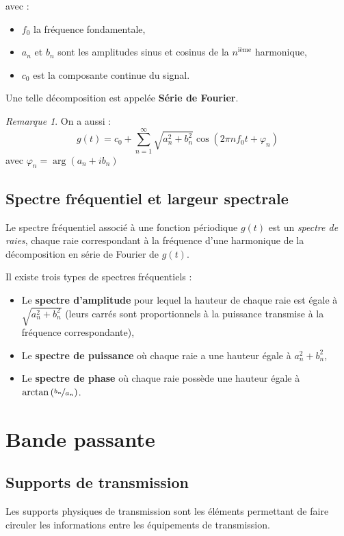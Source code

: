 \documentclass[11pt,english,french]{scrreprt}
\theoremstyle{remark}
\newtheorem*{rem*}{Remarque}
\theoremstyle{definition}
\begin{document}
avec :\begin{itemize}
	\item $f_0$ la fréquence fondamentale,
	\item $a_n$ et $b_n$ sont les amplitudes sinus et cosinus de la $n^{\textrm{ième}}$ harmonique,
	\item $c_0$ est la composante continue du signal.
\end{itemize}
Une telle décomposition est appelée \textbf{Série de Fourier}. 

\begin{rem*}
	On a aussi :
	\[
		g(t)=c_0+\sum_{n=1}^{\infty}\sqrt{a_n^2+b_n^2}\cos(2\pi n f_0 t+\varphi_n)
	\]avec $\varphi_n=\arg(a_n+i b_n)$
\end{rem*}

\subsection{Spectre fréquentiel et largeur spectrale} %

Le spectre fréquentiel associé à une fonction périodique $g(t)$ est un \emph{spectre de raies}, chaque raie correspondant à la fréquence d'une harmonique de la décomposition en série de Fourier de $g(t)$. 

Il existe trois types de spectres fréquentiels :\begin{itemize}
	\item Le \textbf{spectre d'amplitude} pour lequel la hauteur de chaque raie est égale à $\sqrt{a_n^2+b_n^2}$ (leurs carrés sont proportionnels à la puissance transmise à la fréquence correspondante),
	\item Le \textbf{spectre de puissance} où chaque raie a une hauteur égale à $a_n^2+b_n^2$,
	\item Le \textbf{spectre de phase} où chaque raie possède une hauteur égale à $\arctan\left(\nicefrac{b_n}{a_n}\right)$.
\end{itemize}

\section{Bande passante} %

\subsection{Supports de transmission} %

Les supports physiques de transmission sont les éléments permettant de faire circuler les informations entre les équipements de transmission. 
\end{document}
